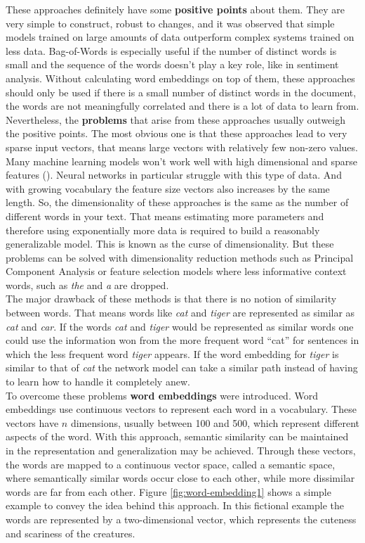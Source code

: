 \documentclass[]{krantz}
\begin{document}
These approaches definitely have some \textbf{positive points} about them. They are very simple to construct, robust to changes, and it was observed that simple models trained on large amounts of data outperform complex systems trained on less data. Bag-of-Words is especially useful if the number of distinct words is small and the sequence of the words doesn't play a key role, like in sentiment analysis. Without calculating word embeddings on top of them, these approaches should only be used if there is a small number of distinct words in the document, the words are not meaningfully correlated and there is a lot of data to learn from.\\
Nevertheless, the \textbf{problems} that arise from these approaches usually outweigh the positive points. The most obvious one is that these approaches lead to very sparse input vectors, that means large vectors with relatively few non-zero values. Many machine learning models won't work well with high dimensional and sparse features (\citet{goldberg2016primer}). Neural networks in particular struggle with this type of data. And with growing vocabulary the feature size vectors also increases by the same length. So, the dimensionality of these approaches is the same as the number of different words in your text. That means estimating more parameters and therefore using exponentially more data is required to build a reasonably generalizable model. This is known as the curse of dimensionality. But these problems can be solved with dimensionality reduction methods such as Principal Component Analysis or feature selection models where less informative context words, such as \emph{the} and \emph{a} are dropped.\\
The major drawback of these methods is that there is no notion of similarity between words. That means words like \emph{cat} and \emph{tiger} are represented as similar as \emph{cat} and \emph{car}. If the words \emph{cat} and \emph{tiger} would be represented as similar words one could use the information won from the more frequent word ``cat'' for sentences in which the less frequent word \emph{tiger} appears. If the word embedding for \emph{tiger} is similar to that of \emph{cat} the network model can take a similar path instead of having to learn how to handle it completely anew.\\

To overcome these problems \textbf{word embeddings} were introduced. Word embeddings use continuous vectors to represent each word in a vocabulary. These vectors have \(n\) dimensions, usually between 100 and 500, which represent different aspects of the word. With this approach, semantic similarity can be maintained in the representation and generalization may be achieved. Through these vectors, the words are mapped to a continuous vector space, called a semantic space, where semantically similar words occur close to each other, while more dissimilar words are far from each other. Figure \ref{fig:word-embedding1} shows a simple example to convey the idea behind this approach. In this fictional example the words are represented by a two-dimensional vector, which represents the cuteness and scariness of the creatures.
\end{document}
